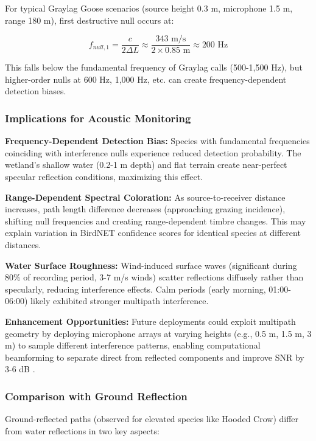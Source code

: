\documentclass[twocolumn]{article}
\begin{document}
For typical Graylag Goose scenarios (source height 0.3 m, microphone 1.5 m, range 180 m), first destructive null occurs at:

\begin{equation}
f_{null,1} = \frac{c}{2\Delta L} \approx \frac{343 \text{ m/s}}{2 \times 0.85 \text{ m}} \approx 200 \text{ Hz}
\end{equation}

This falls below the fundamental frequency of Graylag calls (500-1,500 Hz), but higher-order nulls at 600 Hz, 1,000 Hz, etc. can create frequency-dependent detection biases.

\subsubsection{Implications for Acoustic Monitoring}

\textbf{Frequency-Dependent Detection Bias:} Species with fundamental frequencies coinciding with interference nulls experience reduced detection probability. The wetland's shallow water (0.2-1 m depth) and flat terrain create near-perfect specular reflection conditions, maximizing this effect.

\textbf{Range-Dependent Spectral Coloration:} As source-to-receiver distance increases, path length difference decreases (approaching grazing incidence), shifting null frequencies and creating range-dependent timbre changes. This may explain variation in BirdNET confidence scores for identical species at different distances.

\textbf{Water Surface Roughness:} Wind-induced surface waves (significant during 80\% of recording period, 3-7 m/s winds) scatter reflections diffusely rather than specularly, reducing interference effects. Calm periods (early morning, 01:00-06:00) likely exhibited stronger multipath interference.

\textbf{Enhancement Opportunities:} Future deployments could exploit multipath geometry by deploying microphone arrays at varying heights (e.g., 0.5 m, 1.5 m, 3 m) to sample different interference patterns, enabling computational beamforming to separate direct from reflected components and improve SNR by 3-6 dB \citep{Blumstein2011}.

\subsubsection{Comparison with Ground Reflection}

Ground-reflected paths (observed for elevated species like Hooded Crow) differ from water reflections in two key aspects:
\end{document}

